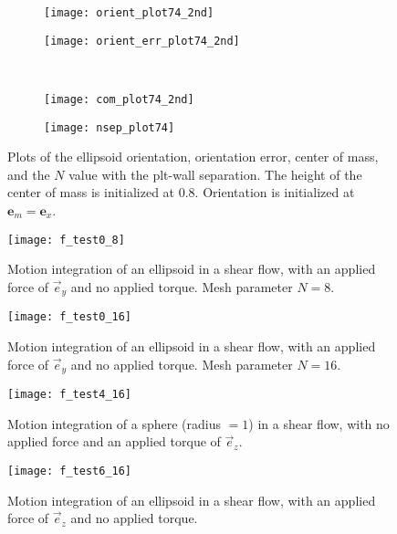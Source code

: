 \documentclass{article}
\newcommand{\vect}[1]{\boldsymbol{\mathbf{#1}}}
\begin{document}
\begin{figure}
  \centering
  \begin{subfigure}{0.49\textwidth}
    \texttt{[image: orient\_plot74\_2nd]}
  \end{subfigure}
  \hfill
  \begin{subfigure}{0.49\textwidth}
    \texttt{[image: orient\_err\_plot74\_2nd]}
  \end{subfigure}
  \\
  \begin{subfigure}{0.49\textwidth}
    \texttt{[image: com\_plot74\_2nd]}
  \end{subfigure}
  \hfill
  \begin{subfigure}{0.49\textwidth}
    \texttt{[image: nsep\_plot74]}
  \end{subfigure}  
  \caption{Plots of the ellipsoid orientation, orientation error,
    center of mass, and the $N$ value with the plt-wall
    separation. The height of the center of mass is initialized at
    $0.8$. Orientation is initialized at $\vect{e}_m =
    \vect{e}_x$.}
  \label{fig:plt74}
\end{figure}

\begin{figure}
  \centering
  \texttt{[image: f\_test0\_8]}
  \caption{Motion integration of an ellipsoid in a shear flow, with an
    applied force of $\vec{e}_y$ and no applied torque. Mesh parameter
  $N = 8$.}
  \label{fig:f08_plot}
\end{figure}

\begin{figure}
  \centering
  \texttt{[image: f\_test0\_16]}
  \caption{Motion integration of an ellipsoid in a shear flow, with an
    applied force of $\vec{e}_y$ and no applied torque. Mesh parameter
  $N = 16$.}
  \label{fig:f016_plot}
\end{figure}

\begin{figure}
  \centering
  \texttt{[image: f\_test4\_16]}
  \caption{Motion integration of a sphere (radius $=1$) in a shear
    flow, with no applied force and an applied torque of $\vec{e}_z$.}
  \label{fig:f4_plot}
\end{figure}

\begin{figure}
  \centering
  \texttt{[image: f\_test6\_16]}
  \caption{Motion integration of an ellipsoid in a shear flow, with an
    applied force of $\vec{e}_z$ and no applied torque.}
  \label{fig:f6_plot}
\end{figure}
\end{document}
